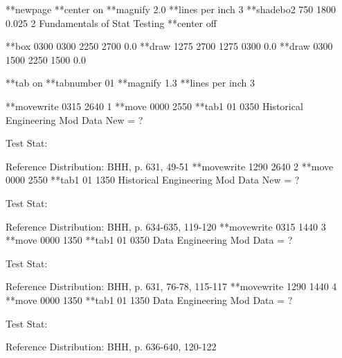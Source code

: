 **newpage
**center on
**magnify 2.0
**lines per inch 3
**shadebo2 750 1800 0.025 2
Fundamentals of
Stat Testing
**center off
 
**box 0300 0300 2250 2700 0.0
**draw 1275 2700 1275 0300 0.0
**draw 0300 1500 2250 1500 0.0
 
**tab on
**tabnumber 01
**magnify 1.3
**lines per inch 3
 
**movewrite 0315 2640 1
**move 0000 2550
**tab1 01 0350
Historical
Engineering Mod
Data
New        =        ?
 
Test Stat:
 
 
Reference Distribution:
BHH, p. 631, 49-51
**movewrite 1290 2640 2
**move 0000 2550
**tab1 01 1350
Historical
Engineering Mod
Data
New        =        ?
 
Test Stat:
 
 
Reference Distribution:
BHH, p. 634-635, 119-120
**movewrite 0315 1440 3
**move 0000 1350
**tab1 01 0350
Data
Engineering Mod
Data
        =        ?
 
Test Stat:
 
 
Reference Distribution:
BHH, p. 631, 76-78, 115-117
**movewrite 1290 1440 4
**move 0000 1350
**tab1 01 1350
Data
Engineering Mod
Data
       =        ?
 
Test Stat:
 
 
Reference Distribution:
BHH, p. 636-640, 120-122
